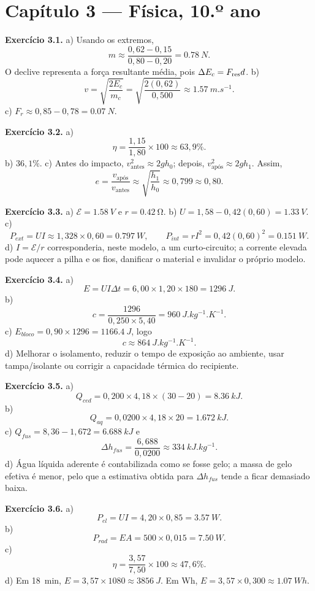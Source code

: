 \documentclass[11pt,a4paper,openany]{book}
\begin{document}
\section*{Capítulo 3 — Física, 10.º ano}

\textbf{Exercício 3.1.} a) Usando os extremos,
\[
m\approx\frac{0,62-0,15}{0,80-0,20}=\SI{0.78}{N}.
\]
O declive representa a força resultante média, pois $\Delta E_c=F_{\rm res}d$. b)
\[
v=\sqrt{\frac{2E_c}{m_c}}=\sqrt{\frac{2(0,62)}{0,500}}
\approx\SI{1.57}{m.s^{-1}}.
\]
c) $F_r\approx0,85-0,78=\SI{0.07}{N}$.

\medskip
\textbf{Exercício 3.2.} a)
\[
\eta=\frac{1,15}{1,80}\times100\approx63,9\%.
\]
b) $36,1\%$. c) Antes do impacto, $v_{\text{antes}}^2\approx2gh_0$; depois, $v_{\text{após}}^2\approx2gh_1$. Assim,
\[
e=\frac{v_{\text{após}}}{v_{\text{antes}}}\approx\sqrt{\frac{h_1}{h_0}}
\approx0,799\approx0,80.
\]

\medskip
\textbf{Exercício 3.3.} a) $\mathcal E=\SI{1.58}{V}$ e $r=\SI{0.42}{\ohm}$. b) $U=1,58-0,42(0,60)=\SI{1.33}{V}$. c)
\[
P_{ext}=UI\approx1,328\times0,60=\SI{0.797}{W},
\qquad
P_{int}=rI^2=0,42(0,60)^2=\SI{0.151}{W}.
\]
d) $I=\mathcal E/r$ corresponderia, neste modelo, a um curto-circuito; a corrente elevada pode aquecer a pilha e os fios, danificar o material e invalidar o próprio modelo.

\medskip
\textbf{Exercício 3.4.} a)
\[
E=UI\Delta t=6,00\times1,20\times180=\SI{1296}{J}.
\]
b)
\[
c=\frac{1296}{0,250\times5,40}=\SI{960}{J.kg^{-1}.K^{-1}}.
\]
c) $E_{bloco}=0,90\times1296=\SI{1166.4}{J}$, logo
\[
c\approx\SI{864}{J.kg^{-1}.K^{-1}}.
\]
d) Melhorar o isolamento, reduzir o tempo de exposição ao ambiente, usar tampa/isolante ou corrigir a capacidade térmica do recipiente.

\medskip
\textbf{Exercício 3.5.} a)
\[
Q_{ced}=0,200\times4,18\times(30-20)=\SI{8.36}{kJ}.
\]
b)
\[
Q_{aq}=0,0200\times4,18\times20=\SI{1.672}{kJ}.
\]
c) $Q_{fus}=8,36-1,672=\SI{6.688}{kJ}$ e
\[
\Delta h_{fus}=\frac{6,688}{0,0200}\approx\SI{334}{kJ.kg^{-1}}.
\]
d) Água líquida aderente é contabilizada como se fosse gelo; a massa de gelo efetiva é menor, pelo que a estimativa obtida para $\Delta h_{fus}$ tende a ficar demasiado baixa.

\medskip
\textbf{Exercício 3.6.} a)
\[
P_{el}=UI=4,20\times0,85=\SI{3.57}{W}.
\]
b)
\[
P_{rad}=EA=500\times0,015=\SI{7.50}{W}.
\]
c)
\[
\eta=\frac{3,57}{7,50}\times100\approx47,6\%.
\]
d) Em \SI{18}{min}, $E=3,57\times1080\approx\SI{3856}{J}$. Em Wh, $E=3,57\times0,300\approx\SI{1.07}{Wh}$.
\end{document}
